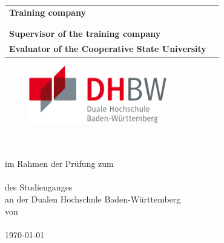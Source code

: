 {\begin{titlepage}
\begin{center}
\begin{spacing}{0.8}
\begin{tabular}{ll}
					\textbf{Training company}              					 &  \firmaName\\
																							& \firmaStrasse \\
																							& \firmaPlz\\[0.2cm]
					\textbf{Supervisor of the training company}          &  \betreuerFirma\\[0.2cm]
					\textbf{Evaluator of the  Cooperative State University}    &  \betreuerDhbw\\[0.2cm]
				\end{tabular} 
			\end{spacing}
		\end{center}
	\end{titlepage}
}
{
\begin{titlepage}
	\enlargethispage{4cm}
	\begin{figure}
		\begin{minipage}{0.49\textwidth}
			\flushleft
		\end{minipage}
		\hfill
		\begin{minipage}{0.49\textwidth}
			\flushright
			\includegraphics[height=2.5cm]{images/logos/dhbw.pdf} 
		\end{minipage}
	\end{figure} 
	\vspace*{0.1cm}
	\begin{center}
		\huge{\textbf{\titel}}\\[1.5cm]
		\Large{\textbf{\arbeit}}\\[0.5cm]
		\normalsize{im Rahmen der Prüfung zum\\[1ex] \textbf{\abschluss}}\\[0.5cm]
		\Large{des Studienganges \studiengang}\\[1ex]
		\normalsize{an der Dualen Hochschule Baden-Württemberg \dhbwStandort}\\[1cm]
		\normalsize{von}\\[1ex] \Large{\textbf{\vorname\,\nachname}} \\[1cm]
		\normalsize{{\printdayoff\today}}\\[2.25cm]

\end{center}
\end{titlepage}}
